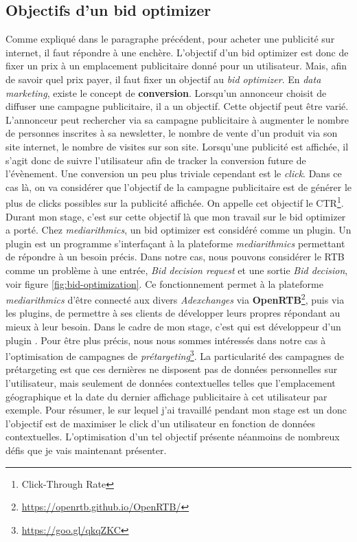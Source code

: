     \subsection{Objectifs d'un bid optimizer}
        Comme expliqué dans le paragraphe précédent, pour acheter une publicité sur internet, il faut répondre à une enchère. L'objectif d'un bid optimizer est donc de fixer un prix à un emplacement publicitaire donné pour un utilisateur. Mais, afin de savoir quel prix payer, il faut fixer un objectif au \emph{bid optimizer}. En \emph{data marketing}, existe le concept de \textbf{conversion}. Lorsqu'un annonceur choisit de diffuser une campagne publicitaire, il a un objectif. Cette objectif peut être varié. L'annonceur peut rechercher via sa campagne publicitaire à augmenter le nombre de personnes inscrites à sa newsletter, le nombre de vente d'un produit via son site internet, le nombre de visites sur son site. Lorsqu'une publicité est affichée, il s'agit donc de suivre l'utilisateur afin de tracker la conversion future de l'évènement. Une conversion un peu plus triviale cependant est le \emph{click}. Dans ce cas là, on va considérer que l'objectif de la campagne publicitaire est de générer le plus de clicks possibles sur la publicité affichée. On appelle cet objectif le CTR\footnote{Click-Through Rate}. Durant mon stage, c'est sur cette objectif là que mon travail sur le bid optimizer a porté. Chez \emph{mediarithmics}, un bid optimizer est considéré comme un plugin. Un plugin est un programme s'interfaçant à la plateforme \emph{mediarithmics} permettant de répondre à un besoin précis. Dans notre cas, nous pouvons considérer le RTB comme un problème à une entrée, \emph{Bid decision request} et une sortie \emph{Bid decision}, voir figure \ref{fig:bid-optimization}. Ce fonctionnement permet à la plateforme \emph{mediarithmics} d'être connecté aux divers \emph{Adexchanges} via \textbf{OpenRTB}\footnote{\url{https://openrtb.github.io/OpenRTB/}}, puis via les plugins, de permettre à ses clients de développer leurs propres \bo répondant au mieux à leur besoin. Dans le cadre de mon stage, c'est \med qui est développeur d'un plugin \bo. Pour être plus précis, nous nous sommes intéressés dans notre cas à l'optimisation de campagnes de \emph{prétargeting}\footnote{\url{https://goo.gl/qkqZKC}}. La particularité des campagnes de prétargeting est que ces dernières ne disposent pas de données personnelles sur l'utilisateur, mais seulement de données contextuelles telles que l'emplacement géographique et la date du dernier affichage publicitaire à cet utilisateur par exemple. Pour résumer, le \bo sur lequel j'ai travaillé pendant mon stage est un \bo donc l'objectif est de maximiser le click d'un utilisateur en fonction de données contextuelles. L'optimisation d'un tel objectif présente néanmoins de nombreux défis que je vais maintenant présenter.
